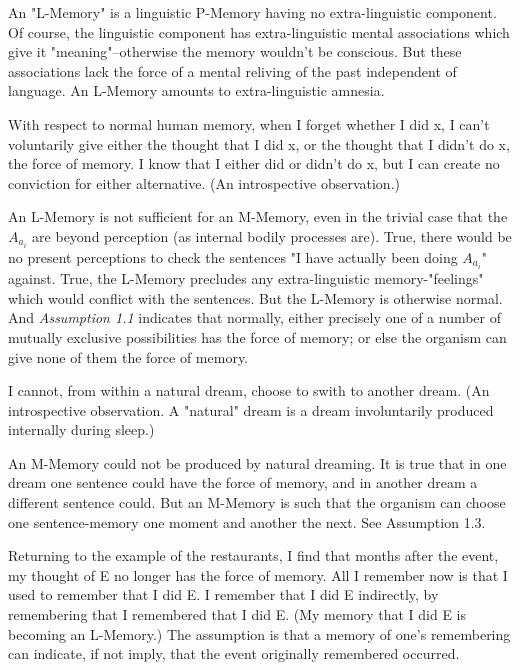  An "L-Memory" is a linguistic P-Memory having no 
extra-linguistic component. Of course, the linguistic component has 
extra-linguistic mental associations which give it "meaning"--otherwise the 
memory wouldn't be conscious. But these associations lack the force of a 
mental reliving of the past independent of language. An L-Memory amounts 
to extra-linguistic amnesia. 

 With respect to normal human memory, when I forget 
whether I did x, I can't voluntarily give either the thought that I did x, or 
the thought that I didn't do x, the force of memory. I know that I either did 
or didn't do x, but I can create no conviction for either alternative. (An 
introspective observation.) 

 An L-Memory is not sufficient for an M-Memory, even 
in the trivial case that the $A_{a_i}$ are beyond perception (as internal bodily 
processes are). True, there would be no present perceptions to check the 
sentences "I have actually been doing $A_{a_i}$" against. True, the L-Memory 
precludes any extra-linguistic memory-"feelings" which would conflict with 
the sentences. But the L-Memory is otherwise normal. And \textit{Assumption 1.1}
indicates that normally, either precisely one of a number of mutually 
exclusive possibilities has the force of memory; or else the organism can give 
none of them the force of memory. 

 I cannot, from within a natural dream, choose to swith 
to another dream. (An introspective observation. A "natural" dream is a 
dream involuntarily produced internally during sleep.) 

 An M-Memory could not be produced by natural 
dreaming. It is true that in one dream one sentence could have the force of 
memory, and in another dream a different sentence could. But an M-Memory 
is such that the organism can choose one sentence-memory one moment and 
another the next. See Assumption 1.3. 

 Returning to the example of the restaurants, I find 
that months after the event, my thought of E no longer has the force of 
memory. All I remember now is that I used to remember that I did E. I 
remember that I did E indirectly, by remembering that I remembered that I 
did E. (My memory that I did E is becoming an L-Memory.) The assumption 
is that a memory of one's remembering can indicate, if not imply, that the 
event originally remembered occurred. 

